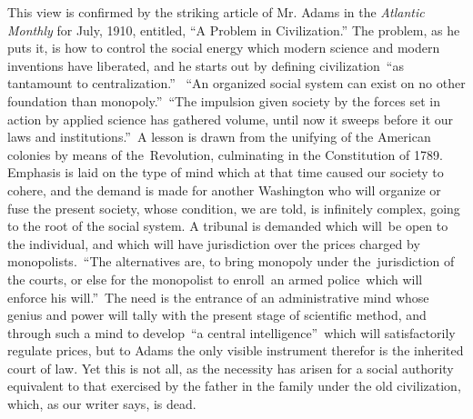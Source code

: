 \documentclass[openany,nobib]{tufte-book}
\begin{document}
This view is confirmed by the striking article of Mr. Adams in the
\emph{Atlantic Monthly} for July, 1910, entitled, ``A Problem in
Civilization.'' The problem, as he puts it, is how to control the social
energy which modern science and modern inventions have liberated, and he
starts out by defining civilization~``as tantamount to centralization.''
~``An organized social system can exist on no other foundation than
monopoly.''~``The impulsion given society by the forces set in action by
applied science has gathered volume, until now it sweeps before it our
laws and institutions.''~A lesson is drawn from the unifying of the
American colonies by means of the~Revolution, culminating in the
Constitution of 1789. Emphasis is laid on the type of mind which at that
time caused our society to cohere, and the demand is made for another
Washington who will organize or fuse the present society, whose
condition, we are told, is infinitely complex, going to the root of the
social system. A tribunal is demanded which will~be open to the
individual, and which will have jurisdiction over the prices charged by
monopolists.~``The alternatives are, to bring monopoly under
the~jurisdiction of the courts, or else for the monopolist to enroll~an
armed police~which will enforce his will.''~The need is the entrance of
an administrative mind whose genius and power will tally with the
present stage of scientific method, and through such a mind to
develop~``a central intelligence''~which will satisfactorily regulate
prices, but to Adams the only visible instrument therefor is the
inherited court of law. Yet this is not all, as the necessity has arisen
for a social authority equivalent to that exercised by the father in the
family under the old civilization, which, as our writer says, is dead.~
\end{document}
